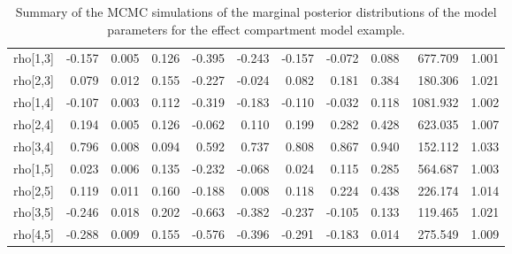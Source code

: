\documentclass[10pt, reqno, oneside]{amsbook}
\numberwithin{equation}{chapter}
\numberwithin{figure}{chapter}
\numberwithin{table}{chapter}
\theoremstyle{remark}
\begin{document}
\begin{table}[htbp]
\begin{tabular}{r r r r r r r r r r r}
rho[1,3] & -0.157 & 0.005 & 0.126 & -0.395 & -0.243 & -0.157 & -0.072 & 0.088 & 677.709 & 1.001\\
rho[2,3] & 0.079 & 0.012 & 0.155 & -0.227 & -0.024 & 0.082 & 0.181 & 0.384 & 180.306 & 1.021\\
rho[1,4] & -0.107 & 0.003 & 0.112 & -0.319 & -0.183 & -0.110 & -0.032 & 0.118 & 1081.932 & 1.002\\
rho[2,4] & 0.194 & 0.005 & 0.126 & -0.062 & 0.110 & 0.199 & 0.282 & 0.428 & 623.035 & 1.007\\
rho[3,4] & 0.796 & 0.008 & 0.094 & 0.592 & 0.737 & 0.808 & 0.867 & 0.940 & 152.112 & 1.033\\
rho[1,5] & 0.023 & 0.006 & 0.135 & -0.232 & -0.068 & 0.024 & 0.115 & 0.285 & 564.687 & 1.003\\
rho[2,5] & 0.119 & 0.011 & 0.160 & -0.188 & 0.008 & 0.118 & 0.224 & 0.438 & 226.174 & 1.014\\
rho[3,5] & -0.246 & 0.018 & 0.202 & -0.663 & -0.382 & -0.237 & -0.105 & 0.133 & 119.465 & 1.021\\
rho[4,5] & -0.288 & 0.009 & 0.155 & -0.576 & -0.396 & -0.291 & -0.183 & 0.014 & 275.549 & 1.009\\
\end{tabular}
\caption{\label{effCptModelParms}
Summary of the MCMC simulations of the marginal posterior distributions of the model parameters for the effect compartment model example.}

\end{table}
\end{document}
